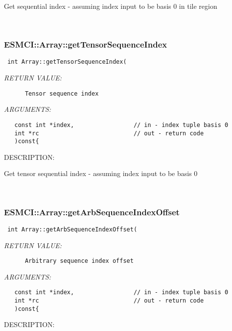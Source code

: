       Get sequential index - assuming index input to be basis 0 in tile region
   
 
\mbox{}\hrulefill\
 
\subsubsection [ESMCI::Array::getTensorSequenceIndex] {ESMCI::Array::getTensorSequenceIndex}


  
\begin{verbatim} int Array::getTensorSequenceIndex(\end{verbatim}{\em RETURN VALUE:}
\begin{verbatim}      Tensor sequence index\end{verbatim}{\em ARGUMENTS:}
\begin{verbatim}   const int *index,                 // in - index tuple basis 0
   int *rc                           // out - return code
   )const{\end{verbatim}
{\sf DESCRIPTION:\\ }


      Get tensor sequential index - assuming index input to be basis 0
   
 
\mbox{}\hrulefill\
 
\subsubsection [ESMCI::Array::getArbSequenceIndexOffset] {ESMCI::Array::getArbSequenceIndexOffset}


  
\begin{verbatim} int Array::getArbSequenceIndexOffset(\end{verbatim}{\em RETURN VALUE:}
\begin{verbatim}      Arbitrary sequence index offset\end{verbatim}{\em ARGUMENTS:}
\begin{verbatim}   const int *index,                 // in - index tuple basis 0
   int *rc                           // out - return code
   )const{\end{verbatim}
{\sf DESCRIPTION:\\ }


